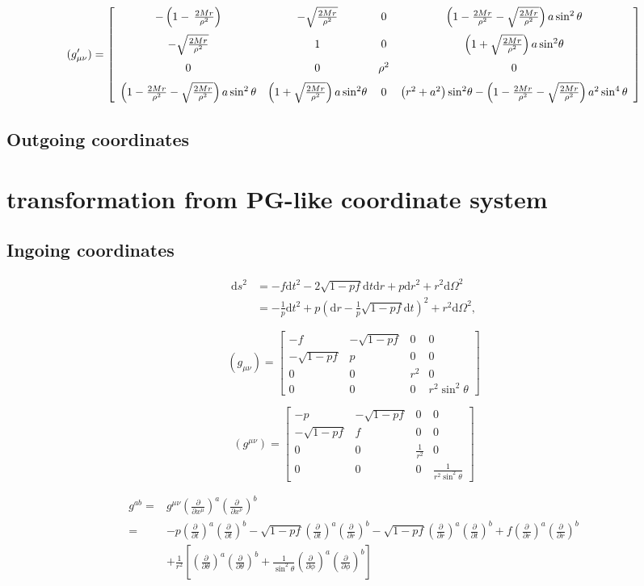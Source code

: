 \documentclass{article}
\newcommand{\be}{\begin{equation}}
\newcommand{\ee}{\end{equation}}
\newcommand{\ba}{\begin{array}}
\newcommand{\ea}{\end{array}}
\newcommand{\p}{\partial}
\newcommand{\1}{\left}
\newcommand{\2}{\right}
\begin{document}
\be 
(g^\prime_{\mu\nu})=\left[ \begin {array}{cccc} -\1(1-\,{\frac {2Mr}{{\rho}^{2}}}\2)&-\sqrt{\frac{2Mr}{\rho^2}}&0&\1(1-\frac{2Mr}{\rho^2}-\sqrt{\frac{2Mr}{\rho^2}}\2)a\sin^2\theta\\ \noalign{\medskip}-\sqrt{\frac{2Mr}{\rho^2}}&1&0&
\1(1+\sqrt{\frac{2Mr}{\rho^2}}\2)a\,{\sin}^{2}\theta\\ \noalign{\medskip}0&0&{\rho}^{2}&0
\\ \noalign{\medskip}\1(1-\frac{2Mr}{\rho^2}-\sqrt{\frac{2Mr}{\rho^2}}\2)a\sin^2\theta&
\1(1+\sqrt{\frac{2Mr}{\rho^2}}\2)a\,{\sin}^{2}\theta&0& \left( {r}^{2}+{a}^{2} \right) {\sin}^{2}\theta
-\1(1-\frac{2Mr}{\rho^2}-\sqrt{\frac{2Mr}{\rho^2}}\2)a^2\sin^4\theta\end {array}
 \right] 
\ee

\subsection{Outgoing coordinates}


\newpage
\section{transformation from PG-like coordinate system}
\subsection{Ingoing coordinates}

\be
\begin{split}
\mathrm ds^2&=-f\mathrm dt^2-2\sqrt{1-pf}\mathrm dt\mathrm dr+p\mathrm dr^2+r^2\mathrm d\Omega^2\\
&=-\frac 1 p \mathrm dt^2+p(\mathrm dr-\frac 1 p \sqrt{1-pf}\mathrm dt)^2+r^2\mathrm d\Omega^2,
\end{split}
\ee

\be
(g_{\mu\nu})=\left[\ba{cccc}-f&-\sqrt{1-pf}&0&0\\-\sqrt{1-pf}&p&0&0\\0&0&r^2&0\\0&0&0&r^2\sin^2\theta\ea\right]
\ee

\be
(g^{\mu\nu})=\left[\ba{cccc}-p&-\sqrt{1-pf}&0&0\\-\sqrt{1-pf}&f&0&0\\0&0&\frac 1 {r^2}&0\\0&0&0&\frac 1 {r^2\sin^2\theta}\ea\right]
\ee

\be
\begin{split}
g^{ab} =& g^{\mu\nu}\1(\frac \p {\p x^\mu}\2)^a\1(\frac \p {\p x^\nu}\2)^b\\
=& -p\1(\frac \p {\p t}\2)^a\1(\frac \p {\p t}\2)^b-\sqrt{1-pf}\1(\frac \p {\p t}\2)^a\1(\frac \p {\p r}\2)^b-\sqrt{1-pf}\1(\frac \p {\p r}\2)^a\1(\frac \p {\p t}\2)^b+f\1(\frac \p {\p r}\2)^a\1(\frac \p {\p r}\2)^b \\
 & +\frac 1 {r^2} \1[\1(\frac \p {\p\theta}\2)^a \1(\frac \p {\p\theta}\2)^b+\frac 1 {\sin^2 \theta} \1(\frac \p {\p\phi}\2)^a \1(\frac \p {\p\phi}\2)^b \2] 
\end{split}
\ee 
\end{document}
